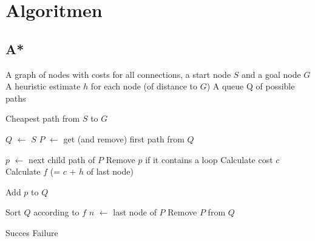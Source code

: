 \documentclass[alternative-exam.tex]{subfiles}
\newcommand{\algorithmicinput}{\textbf{Input:}}
\newcommand{\algorithmicoutput}{\textbf{Output:}}
\newcommand{\INPUT}{\item[\algorithmicinput]}
\newcommand{\OUTPUT}{\item[\algorithmicoutput]}
\newcommand{\algorithmicalgo}{\textbf{Algorithm:}}
\newcommand{\ALGO}{\item[\algorithmicalgo]}
\begin{document}
\appendix
\chapter{Algoritmen}
\section{A*}
\pagestyle{empty}
\begin{algorithmic}
\label{A*}
\INPUT
\STATE A graph of nodes with costs for all connections, a start node $S$ and a goal node $G$
\STATE A heuristic estimate $h$ for each node (of distance to $G$)
\STATE A queue Q of possible paths

\OUTPUT
\STATE Cheapest path from $S$ to $G$
\end{algorithmic}
\begin{algorithmic}
\ALGO
\STATE $Q$ $\leftarrow$ $S$
\STATE $P$ $\leftarrow$ get (and remove) first path from $Q$
\STATE \vspace{-0.5cm}

\STATE $p$ $\leftarrow$ next child path of $P$
\STATE Remove $p$ if it contains a loop
\STATE Calculate cost $c$
\STATE Calculate $f$ (= $c$ + $h$ of last node)

\STATE Add $p$ to $Q$
\ENDWHILE


\STATE Sort $Q$ according to $f$
\STATE $n$ $\leftarrow$ last node of $P$
\STATE Remove $P$ from $Q$
\ENDIF
\ENDFOR

\ENDWHILE
{}
\STATE Succes
\ELSE
\STATE Failure
\ENDIF
\end{algorithmic}
\pagebreak
\end{document}
